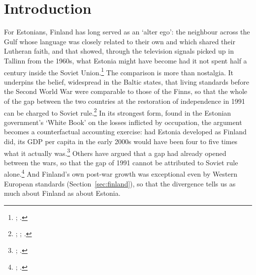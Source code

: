 \documentclass[12pt,a4paper]{article}
\begin{document}
\newpage

\section*{Introduction}

For Estonians, Finland has long served as an `alter ego': the neighbour across the Gulf whose language was closely related to their own and which shared their Lutheran faith, and that showed, through the television signals picked up in Tallinn from the 1960s, what Estonia might have become had it not spent half a century inside the Soviet Union.\footnote{\autocite[77, 78, 83, 86]{lepppantti2013}; \autocite[82]{bocharnikova2021}.} The comparison is more than nostalgia. It underpins the belief, widespread in the Baltic states, that living standards before the Second World War were comparable to those of the Finns, so that the whole of the gap between the two countries at the restoration of independence in 1991 can be charged to Soviet rule.\footnote{\autocite[154]{norkus_restorations}; \autocite[206]{dellenbrant1992}; \autocite[81--2]{bocharnikova2021}.} In its strongest form, found in the Estonian government's `White Book' on the losses inflicted by occupation, the argument becomes a counterfactual accounting exercise: had Estonia developed as Finland did, its GDP per capita in the early 2000s would have been four to five times what it actually was.\footnote{\autocite[141, 168--9]{kukk2005}; \autocite[260]{klesment2009}.} Others have argued that a gap had already opened between the wars, so that the gap of 1991 cannot be attributed to Soviet rule alone.\footnote{\autocite[18]{norkus2016}; \autocite[201]{koll1994gap}.} And Finland's own post-war growth was exceptional even by Western European standards (Section~\ref{sec:finland}), so that the divergence tells us as much about Finland as about Estonia.
\end{document}
